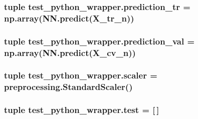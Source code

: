 \subsubsection[{prediction\+\_\+tr}]{\setlength{\rightskip}{0pt plus 5cm}tuple test\+\_\+python\+\_\+wrapper.\+prediction\+\_\+tr = np.\+array(N\+N.\+predict(X\+\_\+tr\+\_\+n))}\label{namespacetest__python__wrapper_ac13fec0366a23feb02327f898755f543}
\hypertarget{namespacetest__python__wrapper_a02c6c99c3b792f419918a024f32e6186}{}
\subsubsection[{prediction\+\_\+val}]{\setlength{\rightskip}{0pt plus 5cm}tuple test\+\_\+python\+\_\+wrapper.\+prediction\+\_\+val = np.\+array(N\+N.\+predict(X\+\_\+cv\+\_\+n))}\label{namespacetest__python__wrapper_a02c6c99c3b792f419918a024f32e6186}
\hypertarget{namespacetest__python__wrapper_a6b08d7d6b53d7c57e8a63155abb4b511}{}
\subsubsection[{scaler}]{\setlength{\rightskip}{0pt plus 5cm}tuple test\+\_\+python\+\_\+wrapper.\+scaler = preprocessing.\+Standard\+Scaler()}\label{namespacetest__python__wrapper_a6b08d7d6b53d7c57e8a63155abb4b511}
\hypertarget{namespacetest__python__wrapper_a6798c3c4cb1b40d7adaadffe659baf9b}{}
\subsubsection[{test}]{\setlength{\rightskip}{0pt plus 5cm}tuple test\+\_\+python\+\_\+wrapper.\+test = \mbox{[}$\,$\mbox{]}}\label{namespacetest__python__wrapper_a6798c3c4cb1b40d7adaadffe659baf9b}
\hypertarget{namespacetest__python__wrapper_aad910dc42f09fd045947a044950c9472}{}
